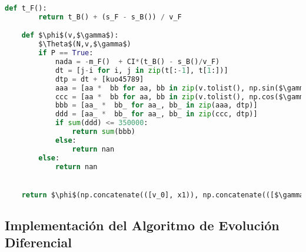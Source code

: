 \documentclass[fleqn]{article}
\begin{document}
\begin{lstlisting}[language=Python, firstnumber=last, style = mystyle, mathescape=true]
    def t_F():
        return t_B() + (s_F - s_B()) / v_F

    def $\phi$(v,$\gamma$): 
        $\Theta$(N,v,$\gamma$)
        if P == True:
            nada = -m_F()  + CI*(t_B() - s_B()/v_F)
            dt = [j-i for i, j in zip(t[:-1], t[1:])]
            dtp = dt + [kuo45789]
            aaa = [aa *  bb for aa, bb in zip(v.tolist(), np.sin($\gamma$).tolist())]
            ccc = [aa *  bb for aa, bb in zip(v.tolist(), np.cos($\gamma$).tolist())]
            bbb = [aa_ *  bb_ for aa_, bb_ in zip(aaa, dtp)]
            ddd = [aa_ *  bb_ for aa_, bb_ in zip(ccc, dtp)]
            if sum(ddd) <= 350000:
                return sum(bbb)
            else:
                return nan
        else:
            return nan


    return $\phi$(np.concatenate(([v_0], x1)), np.concatenate(([$\gamma$_0], x2*$\pi$/180)))
\end{lstlisting}


\subsection{Implementación del Algoritmo de Evolución Diferencial}
\end{document}
